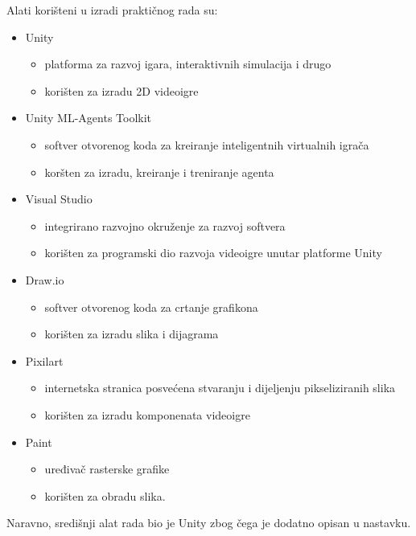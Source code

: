 \documentclass[]{foi} %
\begin{document}
Alati korišteni u izradi praktičnog rada su:
\begin{itemize}
    \item Unity
        \begin{itemize}
            \item platforma za razvoj igara, interaktivnih simulacija i drugo
            \item korišten za izradu 2D videoigre
        \end{itemize}
    \item Unity ML-Agents Toolkit
        \begin{itemize}
            \item softver otvorenog koda za kreiranje inteligentnih virtualnih igrača 
            \item koršten za izradu, kreiranje i treniranje agenta
        \end{itemize}
    \item Visual Studio
        \begin{itemize}
            \item integrirano razvojno okruženje za razvoj softvera
            \item korišten za programski dio razvoja videoigre unutar platforme Unity
        \end{itemize}
    \item Draw.io
        \begin{itemize}
            \item softver otvorenog koda za crtanje grafikona
            \item korišten za izradu slika i dijagrama
        \end{itemize}
    \item Pixilart
        \begin{itemize}
            \item internetska stranica posvećena stvaranju i dijeljenju pikseliziranih slika
            \item korišten za izradu komponenata videoigre
        \end{itemize}
    \item Paint
        \begin{itemize}
            \item uređivač rasterske grafike
            \item korišten za obradu slika.
        \end{itemize}
\end{itemize}

Naravno, središnji alat rada bio je Unity zbog čega je dodatno opisan u nastavku.
\end{document}
